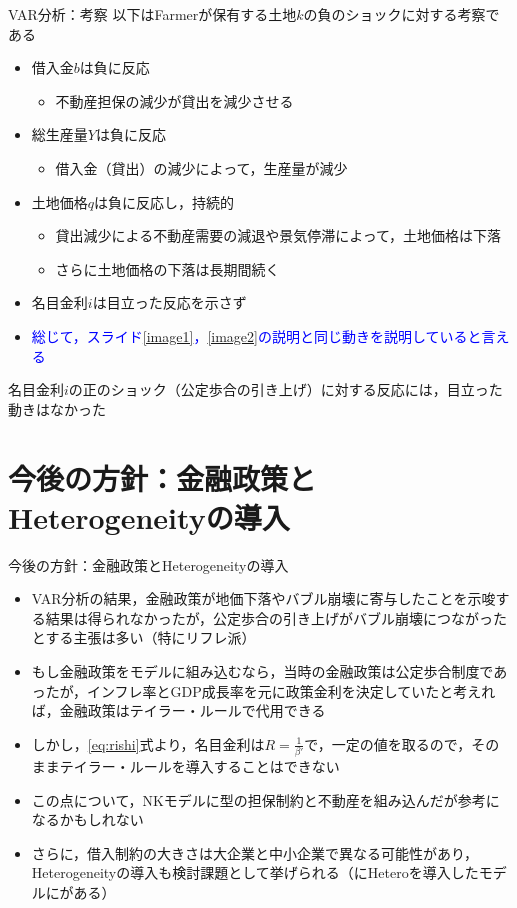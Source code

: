\documentclass[aspectratio=169, dvipdfmx, 11pt, uplatex]{beamer}
\begin{document}
\begin{frame}{VAR分析：考察}
以下はFarmerが保有する土地$k$の負のショックに対する考察である
  \begin{itemize}
    \item 借入金$b$は負に反応
      \begin{itemize}
        \item 不動産担保の減少が貸出を減少させる
      \end{itemize}
    \item 総生産量$Y$は負に反応
      \begin{itemize}
        \item 借入金（貸出）の減少によって，生産量が減少
      \end{itemize}
    \item 土地価格$q$は負に反応し，持続的
      \begin{itemize}
        \item 貸出減少による不動産需要の減退や景気停滞によって，土地価格は下落
        \item さらに土地価格の下落は長期間続く
      \end{itemize}
    \item 名目金利$i$は目立った反応を示さず
    \item \textcolor{blue}{総じて，スライド\ref{image1}，\ref{image2}の説明と同じ動きを説明していると言える}
  \end{itemize}
名目金利$i$の正のショック（公定歩合の引き上げ）に対する反応には，目立った動きはなかった
\end{frame}

\section{今後の方針：金融政策とHeterogeneityの導入}
\begin{frame}{今後の方針：金融政策とHeterogeneityの導入}
  \begin{itemize}
    \item VAR分析の結果，金融政策が地価下落やバブル崩壊に寄与したことを示唆する結果は得られなかったが，公定歩合の引き上げがバブル崩壊につながったとする主張は多い（特にリフレ派）
    \item もし金融政策をモデルに組み込むなら，当時の金融政策は公定歩合制度であったが，インフレ率とGDP成長率を元に政策金利を決定していたと考えれば，金融政策はテイラー・ルールで代用できる
    \item しかし，\eqref{eq:rishi}式より，名目金利は$R=\frac{1}{\beta'}$で，一定の値を取るので，そのままテイラー・ルールを導入することはできない
    \item この点について，NKモデルに\textcite{KM1997}型の担保制約と不動産を組み込んだ\textcite{I2005}が参考になるかもしれない
    \item さらに，借入制約の大きさは大企業と中小企業で異なる可能性があり，Heterogeneityの導入も検討課題として挙げられる（\textcite{KM1997}にHeteroを導入したモデルに\textcite{PR2015}がある）
  \end{itemize}
\end{frame}
\end{document}
